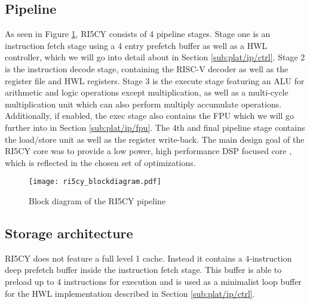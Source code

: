 \documentclass[../bachelor_paper.tex]{subfiles}
\begin{document}
\subsection{Pipeline}
    \label{sec:plat/pipe}
As seen in Figure \ref{fig:plat/base/blockdia}, RI5CY consists of 4 pipeline stages. Stage one is an instruction fetch stage using a 4 entry prefetch buffer as well as a \ac{HWL} controller, which we will go into detail about in Section \ref{sub:plat/ip/ctrl}. Stage 2 is the instruction decode stage, containing the RISC-V decoder as well as the register file and \ac{HWL} registers. Stage 3 is the execute stage featuring an \ac{ALU} for arithmetic and logic operations except multiplication, as well as a multi-cycle multiplication unit which can also perform multiply accumulate operations. Additionally, if enabled, the exec stage also contains the \ac{FPU} which we will go further into in Section \ref{sub:plat/ip/fpu}. The 4th and final pipeline stage contains the load/store unit as well as the register write-back. The main design goal of the RI5CY core was to provide a low power, high performance \ac{DSP} focused core \cite{gautschiNearThresholdRISCVCore2017}, which is reflected in the chosen set of optimizations.

\begin{figure}
    \centering
    \texttt{[image: ri5cy\_blockdiagram.pdf]}
    \caption{Block diagram of the RI5CY pipeline}
    \label{fig:plat/base/blockdia}
\end{figure}

\subsection{Storage architecture}
RI5CY does not feature a full level 1 cache. Instead it contains a 4-instruction deep prefetch buffer inside the instruction fetch stage. This buffer is able to preload up to 4 instructions for execution and is used as a minimalist loop buffer for the \ac{HWL} implementation described in Section \ref{sub:plat/ip/ctrl}.
\end{document}

